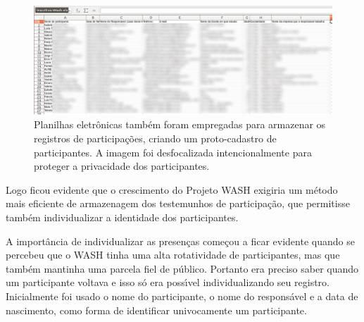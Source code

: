\documentclass[
12pt,		%
openright,	%
twoside,  %
a4paper,			%
chapter=TITLE,		%
english,			%
french,				%
spanish,			%
brazil				%
]{USPSC-classe/USPSC}
\begin{document}
\begin{figure}[max size={\textwidth}{\textheight}]
\begin{minipage}[b]{0.4\linewidth}
        \centering
                \includegraphics[width=1.0\linewidth]{../../imagens/blurred-planilha2.png}
                \caption{Planilhas eletr\^onicas tamb\'em foram empregadas para armazenar os registros de participa\c{c}\~oes, criando um proto-cadastro de participantes. A imagem foi desfocalizada intencionalmente para proteger a privacidade dos participantes.}
                \label{b43907f0fa6b6fb935e7384ab03b508859ff0609}
\end{minipage}%
\hspace{0.5cm}
\end{figure}



Logo ficou evidente que o crescimento do Projeto WASH exigiria um m\'etodo mais eficiente de armazenagem dos testemunhos de participa\c{c}\~ao, que permitisse tamb\'em individualizar a identidade dos participantes.














A import\^ancia de individualizar as presen\c{c}as come\c{c}ou a ficar evidente quando se percebeu que o WASH tinha uma alta rotatividade de participantes, mas que tamb\'em mantinha uma parcela fiel de \textquotedbl p\'ublico\textquotedbl . Portanto era preciso saber quando um participante voltava e isso s\'o era poss\'{\i}vel individualizando seu registro. Inicialmente foi usado o nome do participante, o nome do respons\'avel e a data de nascimento, como forma de identificar univocamente um participante.
\end{document}
